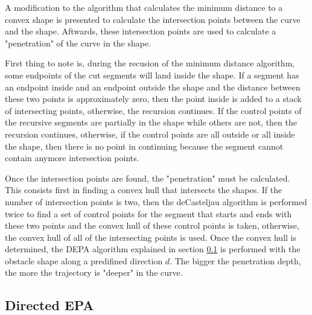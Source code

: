 \par A modification to the algorithm that calculates the minimum distance to a convex shape is presented to calculate the intersection points between the curve and the shape. Aftwards, these intersection points are used to calculate a "penetration" of the curve in the shape.
\par First thing to note is, during the recusion of the minimum distance algorithm, some endpoints of the cut segments will land inside the shape. If a segment has an endpoint inside and an endpoint outside the shape and the distance between these two points is approximately zero, then the point inside is added to a stack of intersecting points, otherwise, the recursion continues. If the control points of the recursive segments are partially in the shape while others are not, then the recursion continues, otherwise, if the control points are all outside or all inside the shape, then there is no point in continuing because the segment cannot contain anymore intersection points.
\par Once the intersection points are found, the "penetration" must be calculated. This consists first in finding a convex hull that intersects the shapes. If the number of intersection points is two, then the deCasteljau algorithm is performed twice to find a set of control points for the segment that starts and ends with these two points and the convex hull of these control points is taken, otherwise, the convex hull of all of the intersecting points is used. Once the convex hull is determined, the \ac{DEPA} algorithm explained in section \ref{sec:epaalg}  is performed with the obstacle shape along a predifined direction $d$. The bigger the penetration depth, the more the trajectory is "deeper" in the curve.



\subsection{Directed EPA}
\label{sec:epaalg}


